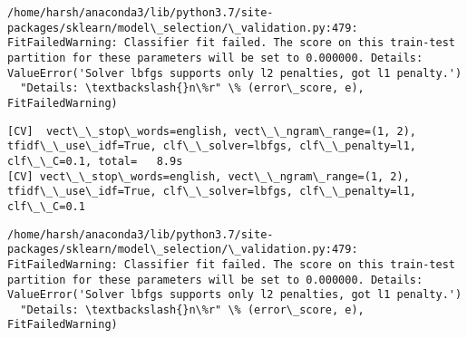 \documentclass[11pt]{article}
\begin{document}
    \begin{Verbatim}[commandchars=\\\{\}]
/home/harsh/anaconda3/lib/python3.7/site-packages/sklearn/model\_selection/\_validation.py:479: FitFailedWarning: Classifier fit failed. The score on this train-test partition for these parameters will be set to 0.000000. Details: 
ValueError('Solver lbfgs supports only l2 penalties, got l1 penalty.')
  "Details: \textbackslash{}n\%r" \% (error\_score, e), FitFailedWarning)

    \end{Verbatim}

    \begin{Verbatim}[commandchars=\\\{\}]
[CV]  vect\_\_stop\_words=english, vect\_\_ngram\_range=(1, 2), tfidf\_\_use\_idf=True, clf\_\_solver=lbfgs, clf\_\_penalty=l1, clf\_\_C=0.1, total=   8.9s
[CV] vect\_\_stop\_words=english, vect\_\_ngram\_range=(1, 2), tfidf\_\_use\_idf=True, clf\_\_solver=lbfgs, clf\_\_penalty=l1, clf\_\_C=0.1 

    \end{Verbatim}

    \begin{Verbatim}[commandchars=\\\{\}]
/home/harsh/anaconda3/lib/python3.7/site-packages/sklearn/model\_selection/\_validation.py:479: FitFailedWarning: Classifier fit failed. The score on this train-test partition for these parameters will be set to 0.000000. Details: 
ValueError('Solver lbfgs supports only l2 penalties, got l1 penalty.')
  "Details: \textbackslash{}n\%r" \% (error\_score, e), FitFailedWarning)

    \end{Verbatim}
\end{document}
